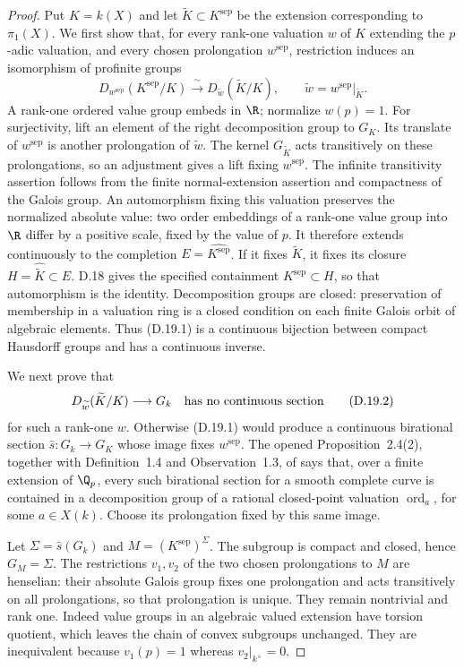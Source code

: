 \begin{proof}
Put $K=k(X)$ and let $\widetilde K\subset K^{\mathrm{sep}}$
be the extension corresponding to $\pi_1(X)$. We first show that,
for every rank-one valuation $w$ of $K$ extending the $p$-adic
valuation, and every chosen prolongation $w^{\mathrm{sep}}$,
restriction induces an isomorphism of profinite groups
\[
 D_{w^{\mathrm{sep}}}(K^{\mathrm{sep}}/K)
       \xrightarrow{\ \sim\ }
 D_{\widetilde w}(\widetilde K/K),
 \qquad \widetilde w=w^{\mathrm{sep}}|_{\widetilde K}.       \tag{D.19.1}
\]
A rank-one ordered value group embeds in $\R$; normalize $w(p)=1$.
For surjectivity, lift an element of the right decomposition group
to $G_K$. Its translate of $w^{\mathrm{sep}}$ is another prolongation
of $\widetilde w$. The kernel $G_{\widetilde K}$ acts transitively
on these prolongations, so an adjustment gives a lift fixing
$w^{\mathrm{sep}}$. The infinite transitivity assertion follows from
the finite normal-extension assertion and compactness of the Galois
group. An automorphism fixing this valuation preserves the normalized
absolute value: two order embeddings of a rank-one value group into
$\R$ differ by a positive scale, fixed by the value of $p$.
It therefore extends continuously to the completion
$E=\widehat{K^{\mathrm{sep}}}$. If it fixes $\widetilde K$, it fixes
its closure $H=\widehat{\widetilde K}\subset E$. D.18 gives the
specified containment $K^{\mathrm{sep}}\subset H$, so that
automorphism is the identity. Decomposition groups are closed:
preservation of membership in a valuation ring is a closed condition
on each finite Galois orbit of algebraic elements. Thus (D.19.1) is
a continuous bijection between compact Hausdorff groups and has a
continuous inverse.

We next prove that
\[
          D_{\widetilde w}(\widetilde K/K)\longrightarrow G_k
                \quad\hbox{has no continuous section}       \tag{D.19.2}
\]
for such a rank-one $w$. Otherwise (D.19.1) would produce a continuous
birational section $\widehat s:G_k\to G_K$ whose image fixes
$w^{\mathrm{sep}}$. The opened Proposition~2.4(2), together with
Definition~1.4 and Observation~1.3, of \citet{D_Koenigsmann2005}
says that, over a finite extension of $\Q_p$, every such birational
section for a smooth complete curve is contained in a decomposition
group of a rational closed-point valuation $\operatorname{ord}_a$,
for some $a\in X(k)$. Choose its prolongation fixed by this same image.

Let $\Sigma=\widehat s(G_k)$ and $M=(K^{\mathrm{sep}})^\Sigma$.
The subgroup is compact and closed, hence $G_M=\Sigma$. The
restrictions $v_1,v_2$ of the two chosen prolongations to $M$ are
henselian: their absolute Galois group fixes one prolongation and
acts transitively on all prolongations, so that prolongation is unique.
They remain nontrivial and rank one. Indeed value groups in an
algebraic valued extension have torsion quotient, which leaves the
chain of convex subgroups unchanged. They are inequivalent because
$v_1(p)=1$ whereas $v_2|_{k^\times}=0$.


\end{proof}

